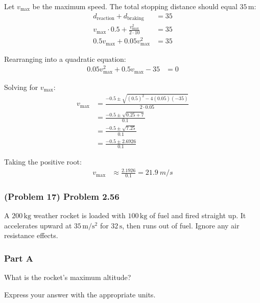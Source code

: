 \begin{solution}
	Let \( v_{\mathrm{max}} \) be the maximum speed. The total stopping distance should equal \( 35 \, \mathrm{m} \):
	\begin{align*}
		d_{\mathrm{reaction}} + d_{\mathrm{braking}} &= 35 \\
		v_{\mathrm{max}} \cdot 0.5 + \frac{v_{\mathrm{max}}^2}{2 \cdot 10} &= 35 \\
		0.5 v_{\mathrm{max}} + 0.05 v_{\mathrm{max}}^2 &= 35
	\end{align*}

	Rearranging into a quadratic equation:
	\begin{align*}
		0.05 v_{\mathrm{max}}^2 + 0.5 v_{\mathrm{max}} - 35 &= 0
	\end{align*}

	Solving for \( v_{\mathrm{max}} \):
	\begin{align*}
		v_{\mathrm{max}} &= \frac{ -0.5 \pm \sqrt{(0.5)^2 - 4(0.05)(-35)} }{2 \cdot 0.05} \\
		&= \frac{ -0.5 \pm \sqrt{0.25 + 7} }{0.1} \\
		&= \frac{ -0.5 \pm \sqrt{7.25} }{0.1} \\
		&= \frac{ -0.5 \pm 2.6926 }{0.1}
	\end{align*}

	Taking the positive root:
	\begin{align*}
		v_{\mathrm{max}} &\approx \frac{2.1926}{0.1} = \boxed{\SI{21.9}{m/s}}
	\end{align*}
\end{solution}

\newpage

\subsubsection{(Problem 17) Problem 2.56}

A \( 200 \, \mathrm{kg} \) weather rocket is loaded with \( 100 \, \mathrm{kg} \) of fuel and fired straight up. It accelerates upward at \( 35 \, \mathrm{m/s^2} \) for \( 32 \, \mathrm{s} \), then runs out of fuel. Ignore any air resistance effects.

\subsubsection{Part A}
What is the rocket's maximum altitude?

Express your answer with the appropriate units.


